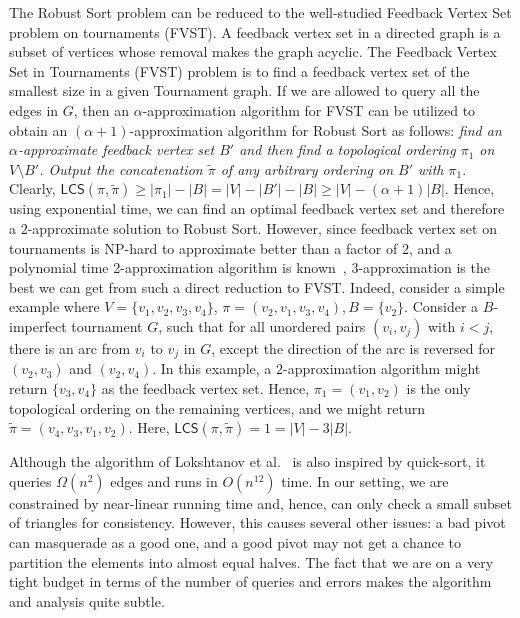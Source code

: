 \documentclass[11pt]{llncs}
\newcommand{\tpi}{{\widetilde \pi}}
\newcommand{\robust}{{\textsf{Robust Sort}}\xspace}
\newcommand{\LCS}{{\textsf{LCS}}}
\newcommand{\fvs}{{\textsf{Feedback Vertex Set}}\xspace}
\begin{document}
The \robust problem can be reduced to the well-studied \fvs problem on tournaments (FVST).
A feedback vertex set in a directed graph is a subset of vertices whose removal makes the graph acyclic. The Feedback Vertex Set in Tournaments (FVST) problem is to find a feedback vertex set of the smallest size in a given Tournament graph.
If we are allowed to query all the edges in $G$, then an $\alpha$-approximation algorithm for FVST can be utilized to obtain an $(\alpha+1)$-approximation algorithm for \robust as follows: {\em find an $\alpha$-approximate feedback vertex set $B'$ and then find a topological ordering $\pi_1$ on $V \setminus B'$. Output the concatenation $\tpi$ of any arbitrary ordering on $B'$ with $\pi_1$}. 
Clearly, $\LCS(\pi, \tpi) \geq |\pi_1| - |B| = |V| - |B'| - |B| \geq |V| - (\alpha+1)|B|.$ Hence, using exponential time, we can find an optimal feedback vertex set and therefore a $2$-approximate solution to \robust. However, since feedback vertex set on tournaments is NP-hard to approximate better than a factor of $2$, and a polynomial time 2-approximation algorithm is known~\cite{fvst}, $3$-approximation is the best we can get from such a direct reduction to FVST. Indeed, consider a simple example where $V = \{v_1, v_2, v_3, v_4\}$, $\pi = (v_2, v_1, v_3, v_4), B = \{v_2\}$. Consider a $B$-imperfect tournament $G$, such that for all unordered pairs $(v_i, v_j)$ with $i < j$, there is an arc from $v_i$ to $v_j$ in $G$, except the direction of the arc is reversed for $(v_2, v_3)$ and $(v_2, v_4)$. In this example, a $2$-approximation algorithm might return $\{v_3, v_4\}$ as the feedback vertex set. Hence, $\pi_1 = (v_1, v_2)$ is the only topological ordering on the remaining vertices, and we might return $\tpi = (v_4, v_3, v_1, v_2)$. Here, $\LCS(\pi, \tpi) = 1 = |V| - 3|B|.$



Although the algorithm of  Lokshtanov et al.~\cite{fvst} is also inspired by quick-sort, it queries $\Omega(n^2)$ edges and runs in $O(n^{12})$ time. In our setting, we are constrained by near-linear running time and, hence, can only check a small subset of triangles for consistency. However, this causes several other issues: a bad pivot can masquerade as a good one, and a good pivot may not get a chance to partition the elements into almost equal halves. The fact that we are on a very tight budget in terms of the number of queries and errors makes the algorithm and analysis quite subtle. \\
 
\end{document}
